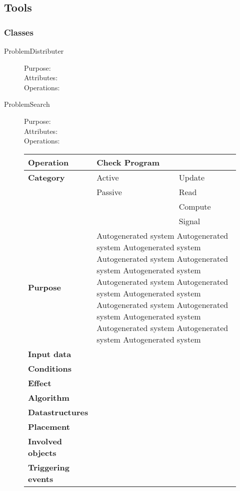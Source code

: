 \subsection{Tools}

\subsubsection{Classes}

\begin{description}
\item[ProblemDistributer]\hfill
\begin{description}
\item[Purpose:]
\item[Attributes:]
\item[Operations:]
\end{description}
\end{description}

\begin{description}
\item[ProblemSearch]\hfill
\begin{description}
\item[Purpose:]
\item[Attributes:]
\item[Operations:]
\end{description}
\end{description}

\begin{figure}
\begin{tabular}{p{3cm} p{4.25cm} p{4.25cm}}
\hline
\textbf{Operation}&Check Program\\
\hline
\textbf{Category}&\underline{ }Active&\underline{ }Update\\
&\underline{ }Passive&\underline{ }Read\\
&&\underline{ }Compute\\
&&\underline{ }Signal\\
\textbf{Purpose}&\multicolumn{2}{p{8.5cm}}{Autogenerated system Autogenerated system Autogenerated system Autogenerated system Autogenerated system Autogenerated system
Autogenerated system Autogenerated system Autogenerated system Autogenerated system Autogenerated system Autogenerated system 
Autogenerated system Autogenerated system Autogenerated system}\\
\textbf{Input data}&\multicolumn{2}{p{8.5cm}}{}\\
\textbf{Conditions}&\multicolumn{2}{p{8.5cm}}{}\\
\textbf{Effect}&\multicolumn{2}{p{8.5cm}}{}\\
\textbf{Algorithm}&\multicolumn{2}{p{8.5cm}}{}\\
\textbf{Datastructures}&\multicolumn{2}{p{8.5cm}}{}\\
\textbf{Placement}&\multicolumn{2}{p{8.5cm}}{}\\
\textbf{Involved objects}&\multicolumn{2}{p{8.5cm}}{}\\
\textbf{Triggering events}&\multicolumn{2}{p{8.5cm}}{}\\
\hline
\end{tabular}
\end{figure}


